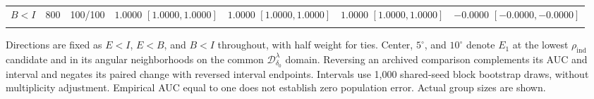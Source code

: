 \documentclass[12pt,letterpaper]{article}
\theoremstyle{plain}
\theoremstyle{definition}
\begin{document}
\begin{table}[p]
\begin{adjustbox}{max width=\linewidth}
\begin{tabular}{lrccccc}
$B<I$ & 800 & 100/100 & \shortstack{$1.0000$\\{\scriptsize$[1.0000,1.0000]$}} & \shortstack{$1.0000$\\{\scriptsize$[1.0000,1.0000]$}} & \shortstack{$1.0000$\\{\scriptsize$[1.0000,1.0000]$}} & \shortstack{$-0.0000$\\{\scriptsize$[-0.0000,-0.0000]$}}\\
\addlinespace
\bottomrule
\end{tabular}
\end{adjustbox}
\par\smallskip
\begin{minipage}{0.98\linewidth}\footnotesize
Directions are fixed as $E<I$, $E<B$, and $B<I$ throughout, with half weight for ties. Center, $5^\circ$, and $10^\circ$ denote $E_1$ at the lowest $\rho_{\mathrm{ind}}$ candidate and in its angular neighborhoods on the common $\mathcal D^\lambda_{\delta_0}$ domain. Reversing an archived comparison complements its AUC and interval and negates its paired change with reversed interval endpoints. Intervals use 1,000 shared-seed block bootstrap draws, without multiplicity adjustment. Empirical AUC equal to one does not establish zero population error. Actual group sizes are shown.
\end{minipage}
\endgroup
\end{table}
\clearpage
\end{document}
